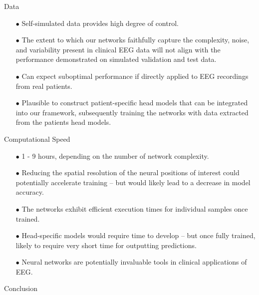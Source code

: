 \documentclass[aspectratio=169, 9pt]{beamer}
\begin{document}
\begin{frame}{Data}
    \begin{itemize}
      \item[$\bullet$] Self-simulated data provides high degree of control.
      \item[$\bullet$] The extent to which our networks faithfully capture the complexity, noise, and variability present in clinical EEG data will not align with the performance demonstrated on simulated validation and test data.
      \item[$\bullet$] Can expect suboptimal performance if directly applied to EEG recordings from real patients.
      \item[$\bullet$] Plausible to construct patient-specific head models that can be integrated into our framework, subsequently training the networks with data extracted from the patients head models.
    \end{itemize}
\end{frame}


\begin{frame}{Computational Speed}
    \begin{itemize}
      \item[$\bullet$] 1 - 9 hours, depending on the number of network complexity.
      \item[$\bullet$] Reducing the spatial resolution of the neural positions of interest could potentially accelerate training -- but would likely lead to a decrease in model accuracy.
      \item[$\bullet$] The networks exhibit efficient execution times for individual samples once trained.
      \item[$\bullet$] Head-specific models would require time to develop -- but once fully trained, likely to require very short time for outputting predictions.
      \item[$\bullet$] Neural networks are potentially invaluable tools in clinical applications of EEG.
    \end{itemize}
\end{frame}


\begin{frame}{Conclusion}
    \begin{itemize}
    \end{itemize}
\end{frame}
\end{document}

